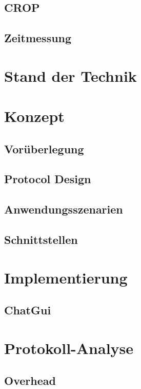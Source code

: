 \documentclass[
    11pt, %
    DIV=11,
    ngerman, %
    a4paper, %
    twoside, %
    titlepage, %
    parskip=half, %
    headings=normal, %
    listof=totoc, %
    bibliography=totoc, %
    index=totoc, %
    captions=tableheading, %
    final %
]{scrreprt}
\begin{document}
	\section{CROP}
		
	\section{Zeitmessung}
		

\chapter{Stand der Technik}
  

\chapter{Konzept}
	
	\section{Vorüberlegung}
		
	\newpage
	\section{Protocol Design}
		
	\section{Anwendungsszenarien}
		
	\section{Schnittstellen}
		

\chapter{Implementierung}
	
	\section{ChatGui}
	

\chapter{Protokoll-Analyse}
	
	\section{Overhead}
		
\end{document}
